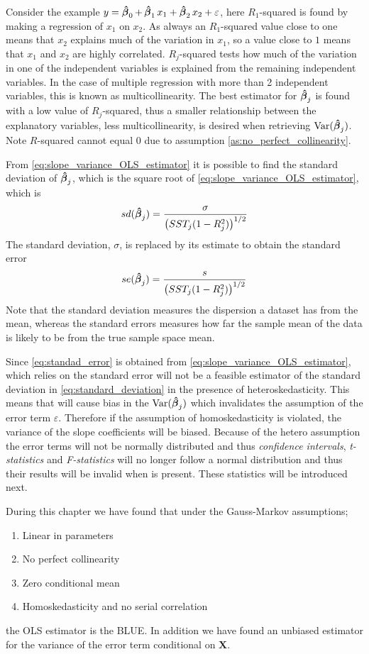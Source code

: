 Consider the example $y = \operatorname{\boldsymbol{\hat{\beta}}}_0 + \operatorname{\boldsymbol{\hat{\beta}}}_1 x_1 + \operatorname{\boldsymbol{\hat{\beta}}}_2 x_2 + \varepsilon$, here $R_1$-squared is found by making a regression of $x_1$ on $x_2$. 
As always an $R_1$-squared value close to one means that $x_2$ explains much of the variation in $x_1$, so a value close to $1$ means that $x_1$ and $x_2$ are highly correlated.
$R_j$-squared tests how much of the variation in one of the independent variables is explained from the remaining independent variables.
In the case of multiple regression with more than 2 independent variables, this is known as multicollinearity.
The best estimator for $\operatorname{\boldsymbol{\hat{\beta}}}_j$ is found with a low value of $R_j$-squared, thus a smaller relationship between the explanatory variables, less multicollinearity, is desired when retrieving $\operatorname{\text{Var}}(\operatorname{\boldsymbol{\hat{\beta}}}_j)$.
Note $R$-squared cannot equal $0$ due to assumption \ref{as:no_perfect_collinearity}. 

From \eqref{eq:slope_variance_OLS_estimator} it is possible to find the standard deviation of $\operatorname{\boldsymbol{\hat{\beta}}}_j$, which is the square root of \ref{eq:slope_variance_OLS_estimator}, which is
\begin{align}\label{eq:standard_deviation}
    sd(\operatorname{\boldsymbol{\hat{\beta}}}_j) = \dfrac{\sigma}{\left(SST_j(1- R_j^2)\right)^{1/2}}
\end{align}
The standard deviation, $\sigma$, is replaced by its estimate to obtain the standard error
\begin{align}\label{eq:standad_error}
    se(\operatorname{\boldsymbol{\hat{\beta}}}_j) = \dfrac{s}{\big(SST_j(1- R_j^2)\big)^{1/2}}
\end{align}
Note that the standard deviation measures the dispersion a dataset has from the mean, whereas the standard errors measures how far the sample mean of the data is likely to be from the true sample space mean. 

Since \eqref{eq:standad_error} is obtained from \eqref{eq:slope_variance_OLS_estimator}, which relies on \homo the standard error will not be a feasible estimator of the standard deviation in \eqref{eq:standard_deviation} in the presence of heteroskedasticity. This means that \hetero will cause bias in the $\operatorname{\text{Var}}(\operatorname{\boldsymbol{\hat{\beta}}}_j)$ which invalidates the assumption of the error term $\varepsilon$.
Therefore if the assumption of homoskedasticity is violated, the variance of the slope coefficients will be biased. Because of the hetero assumption the error terms will not be normally distributed and thus \textit{confidence intervals}, \textit{t-statistics} and \textit{F-statistics} will no longer follow a normal distribution and thus their results will be invalid when \hetero is present. These statistics will be introduced next.

During this chapter we have found that under the Gauss-Markov assumptions;
\begin{enumerate}
    \item Linear in parameters
    \item No perfect collinearity
    \item Zero conditional mean
    \item Homoskedasticity and no serial correlation
\end{enumerate}
 the OLS estimator is the BLUE. 
 In addition we have found an unbiased estimator for the variance of the error term conditional on $\textbf{X}$.